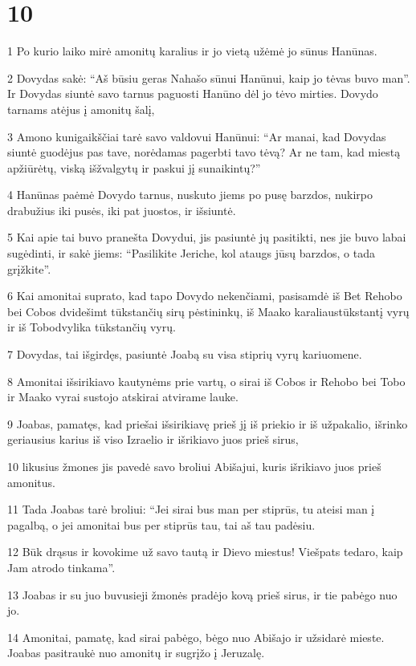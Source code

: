 \chapter{10}


\par 1 Po kurio laiko mirė amonitų karalius ir jo vietą užėmė jo sūnus Hanūnas. 
\par 2 Dovydas sakė: “Aš būsiu geras Nahašo sūnui Hanūnui, kaip jo tėvas buvo man”. Ir Dovydas siuntė savo tarnus paguosti Hanūno dėl jo tėvo mirties. Dovydo tarnams atėjus į amonitų šalį, 
\par 3 Amono kunigaikščiai tarė savo valdovui Hanūnui: “Ar manai, kad Dovydas siuntė guodėjus pas tave, norėdamas pagerbti tavo tėvą? Ar ne tam, kad miestą apžiūrėtų, viską išžvalgytų ir paskui jį sunaikintų?” 
\par 4 Hanūnas paėmė Dovydo tarnus, nuskuto jiems po pusę barzdos, nukirpo drabužius iki pusės, iki pat juostos, ir išsiuntė. 
\par 5 Kai apie tai buvo pranešta Dovydui, jis pasiuntė jų pasitikti, nes jie buvo labai sugėdinti, ir sakė jiems: “Pasilikite Jeriche, kol ataugs jūsų barzdos, o tada grįžkite”. 
\par 6 Kai amonitai suprato, kad tapo Dovydo nekenčiami, pasisamdė iš Bet Rehobo bei Cobos dvidešimt tūkstančių sirų pėstininkų, iš Maako karaliaus­tūkstantį vyrų ir iš Tobo­dvylika tūkstančių vyrų. 
\par 7 Dovydas, tai išgirdęs, pasiuntė Joabą su visa stiprių vyrų kariuomene. 
\par 8 Amonitai išsirikiavo kautynėms prie vartų, o sirai iš Cobos ir Rehobo bei Tobo ir Maako vyrai sustojo atskirai atvirame lauke. 
\par 9 Joabas, pamatęs, kad priešai išsirikiavę prieš jį iš priekio ir iš užpakalio, išrinko geriausius karius iš viso Izraelio ir išrikiavo juos prieš sirus, 
\par 10 likusius žmones jis pavedė savo broliui Abišajui, kuris išrikiavo juos prieš amonitus. 
\par 11 Tada Joabas tarė broliui: “Jei sirai bus man per stiprūs, tu ateisi man į pagalbą, o jei amonitai bus per stiprūs tau, tai aš tau padėsiu. 
\par 12 Būk drąsus ir kovokime už savo tautą ir Dievo miestus! Viešpats tedaro, kaip Jam atrodo tinkama”. 
\par 13 Joabas ir su juo buvusieji žmonės pradėjo kovą prieš sirus, ir tie pabėgo nuo jo. 
\par 14 Amonitai, pamatę, kad sirai pabėgo, bėgo nuo Abišajo ir užsidarė mieste. Joabas pasitraukė nuo amonitų ir sugrįžo į Jeruzalę. 

